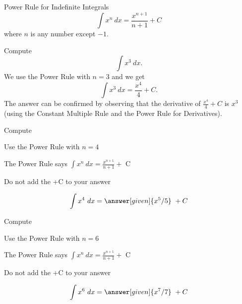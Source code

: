 \documentclass{ximera}
\begin{document}
\begin{theorem} Power Rule for Indefinite Integrals
\[
\int x^n \ dx = \frac{x^{n+1}}{n+1} +C 
\]
where $n$ is any number except $-1$.
\end{theorem}




\begin{example} %
Compute $$\int x^3 \ dx.$$
We use the Power Rule with $n= 3$ and we get
\[\int x^3 \ dx = \frac{x^4}{4} + C.\]  The answer can be confirmed by observing that the 
derivative of $\frac{x^4}{4} +C$ is $x^3$ (using the Constant Multiple Rule and the Power Rule for Derivatives).
\end{example}

\begin{problem} %
Compute 

\begin{hint}
Use the Power Rule with $n=4$
\end{hint}
\begin{hint}
The Power Rule says $\int x^n \ dx = \frac{x^{n+1}}{n+1} +$ C
\end{hint}
\begin{hint}
\begin{center}
Do not add the +C to your answer
\end{center}
\end{hint}

\[
\int x^4 \ dx =
\answer[given]{x^5 /5} \ + C
\]
\end{problem}


\begin{problem} %
Compute 

\begin{hint}
Use the Power Rule with $n=6$
\end{hint}
\begin{hint}
The Power Rule says $\int x^n \ dx = \frac{x^{n+1}}{n+1} +$ C
\end{hint}
\begin{hint}
\begin{center}
Do not add the +C to your answer
\end{center}
\end{hint}

\[
\int x^6 \ dx =
\answer[given]{x^7 /7} \ + C
\]
\end{problem}
\end{document}
